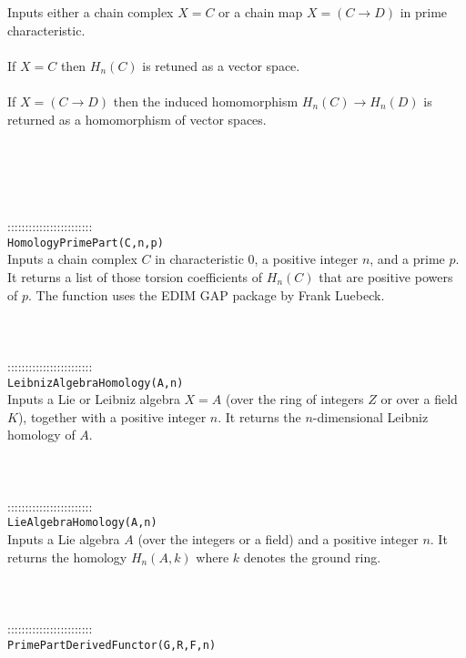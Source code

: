 \documentclass[a4paper,11pt]{report}
\begin{document}
{ Inputs either a chain complex $X=C$ or a chain map $X=(C \longrightarrow D)$ in prime characteristic. \\
 \\
If $X=C$ then $H_n(C)$ is retuned as a vector space.\\
 \\
 If $X=(C \longrightarrow D)$ then the induced homomorphism $H_n(C) \longrightarrow H_n(D)$ is returned as a homomorphism of vector spaces. \\
 \\
 \\
 \\
 \\
 \\
 ::::::::::::::::::::::::\\
 \texttt{HomologyPrimePart(C,n,p)}\\
 

 Inputs a chain complex $C$ in characteristic 0, a positive integer $n$, and a prime $p$. It returns a list of those torsion coefficients of $H_n(C)$ that are positive powers of $p$. The function uses the EDIM GAP package by Frank Luebeck. \\
 \\
 \\
 \\
 ::::::::::::::::::::::::\\
 \texttt{LeibnizAlgebraHomology(A,n)}\\
 

 Inputs a Lie or Leibniz algebra $X=A$ (over the ring of integers $Z$ or over a field $K$), together with a positive integer $n$. It returns the $n$-dimensional Leibniz homology of $A$. \\
 \\
 \\
 \\
 ::::::::::::::::::::::::\\
 \texttt{LieAlgebraHomology(A,n)}\\
 

 Inputs a Lie algebra $A$ (over the integers or a field) and a positive integer $n$. It returns the homology $H_n(A,k)$ where $k$ denotes the ground ring. \\
 \\
 \\
 \\
 ::::::::::::::::::::::::\\
 \texttt{PrimePartDerivedFunctor(G,R,F,n)}\\
 

}
\end{document}
